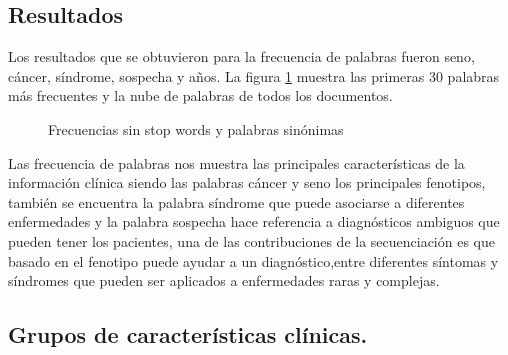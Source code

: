\subsection*{Resultados}

Los resultados que se obtuvieron para la frecuencia de palabras fueron seno, cáncer, síndrome, sospecha y años. La figura \ref{fig:sin} muestra las primeras 30 palabras más frecuentes y la nube de palabras de todos los documentos.\\

\begin{figure}[]
	\centering
	\caption{Frecuencias sin stop words y palabras sinónimas} \label{fig:sin}
\end{figure} 

Las frecuencia de palabras nos muestra las principales características de la información clínica siendo las palabras cáncer y seno los principales fenotipos, también se encuentra la palabra síndrome que puede asociarse a diferentes  enfermedades y la palabra sospecha hace referencia a diagnósticos ambiguos que pueden tener los pacientes, una de las contribuciones de la secuenciación es que basado en el fenotipo puede ayudar a un diagnóstico,entre diferentes síntomas y síndromes que pueden ser aplicados a enfermedades raras y complejas\cite{Tetreault2015a}.

\subsection{Grupos de características clínicas.}

